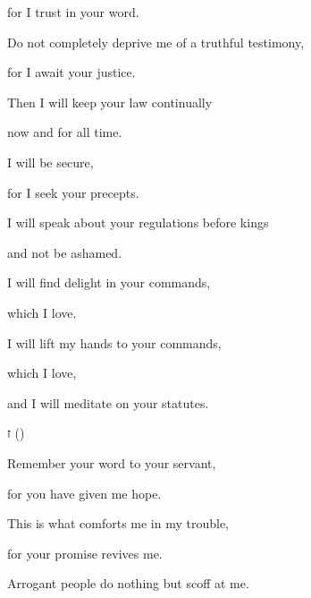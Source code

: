 {\par }{\Q for
I trust
in your word.
\par }{\Q {}Do not
completely deprive me
of a truthful
testimony,
\par }{\Q for
I await
your justice.
\par }{\Q {}Then I will keep
your law
continually
\par }{\Q now and for all time.
\par }{\Q {}I will be secure,
\par }{\Q for
I seek
your precepts.
\par }{\Q {}I will speak
about your regulations
before
kings
\par }{\Q and not
be ashamed.
\par }{\Q {}I will find delight
in your commands,
\par }{\Q which
I love.
\par }{\Q {}I will lift
my hands
to
your commands,
\par }{\Q which
I love,
\par }{\Q and I will meditate
on your statutes.
\par }{\SH ז ({})
\par }{\Q {}Remember your word to your servant,
\par }{\Q for you have given me hope.
\par }{\Q {}This
is what comforts
me in my trouble,
\par }{\Q for
your promise
revives me.
\par }{\Q {}Arrogant
people do nothing but scoff at
me.

}
